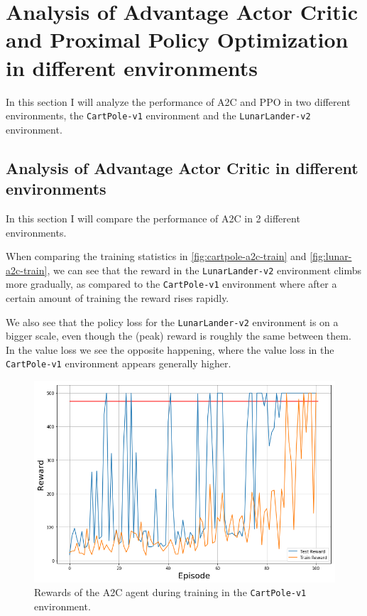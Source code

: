 \documentclass{article}
\begin{document}
 \section[Analysis of A2C and PPO in different environments]{Analysis of 
   Advantage Actor Critic and Proximal Policy Optimization in different 
   environments}
  In this section I will analyze the performance of A2C and PPO in two
  different environments, the \texttt{CartPole-v1} environment and the
  \texttt{LunarLander-v2} environment.

  \subsection[Analysis of A2C in different environment]{Analysis of Advantage
    Actor Critic in different environments}
   In this section I will compare the performance of A2C in 2 different
   environments.

   When comparing the training statistics in \autoref{fig:cartpole-a2c-train}
   and \autoref{fig:lunar-a2c-train}, we can see that the reward in the
   \texttt{LunarLander-v2} environment climbs more gradually, as compared to
   the \texttt{CartPole-v1} environment where after a certain amount of
   training the reward rises rapidly.

   We also see that the policy loss for the \texttt{LunarLander-v2} environment
   is on a bigger scale, even though the (peak) reward is roughly the same
   between them.  In the value loss we see the opposite happening, where the
   value loss in the \texttt{CartPole-v1} environment appears generally higher.

   \begin{figure}[htbp]
    \centering
    \includegraphics[width=\textwidth]{CartPole-A2C-reward}
    \caption{Rewards of the A2C agent during training in the
             \texttt{CartPole-v1} environment.}
    \label{fig:cartpole-a2c-reward}
   \end{figure}
\end{document}
